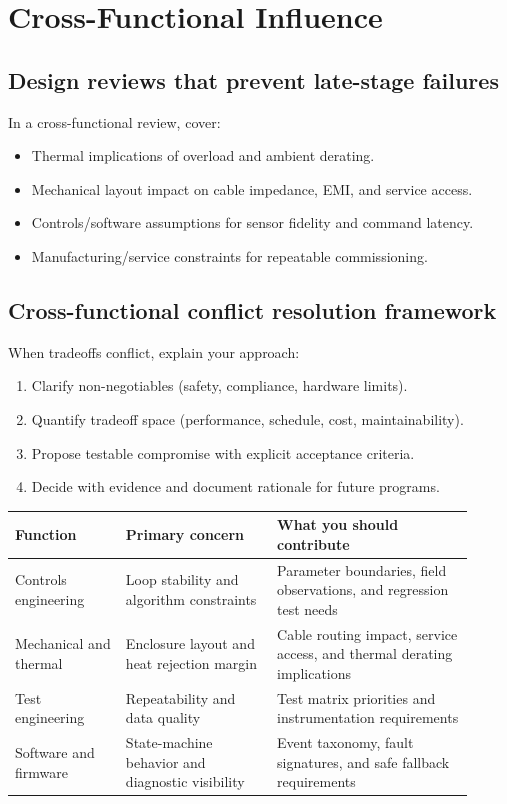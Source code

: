 \documentclass[11pt]{article}
\begin{document}
\section{Cross-Functional Influence}

\subsection{Design reviews that prevent late-stage failures}
In a cross-functional review, cover:
\begin{itemize}
  \item Thermal implications of overload and ambient derating.
  \item Mechanical layout impact on cable impedance, EMI, and service access.
  \item Controls/software assumptions for sensor fidelity and command latency.
  \item Manufacturing/service constraints for repeatable commissioning.
\end{itemize}

\subsection{Cross-functional conflict resolution framework}
When tradeoffs conflict, explain your approach:
\begin{enumerate}
  \item Clarify non-negotiables (safety, compliance, hardware limits).
  \item Quantify tradeoff space (performance, schedule, cost, maintainability).
  \item Propose testable compromise with explicit acceptance criteria.
  \item Decide with evidence and document rationale for future programs.
\end{enumerate}

\begin{table}[h]
\centering
\begin{tabular}{p{0.22\linewidth}p{0.3\linewidth}p{0.39\linewidth}}
\toprule
Function & Primary concern & What you should contribute \\
\midrule
Controls engineering & Loop stability and algorithm constraints & Parameter boundaries, field observations, and regression test needs \\
Mechanical and thermal & Enclosure layout and heat rejection margin & Cable routing impact, service access, and thermal derating implications \\
Test engineering & Repeatability and data quality & Test matrix priorities and instrumentation requirements \\
Software and firmware & State-machine behavior and diagnostic visibility & Event taxonomy, fault signatures, and safe fallback requirements \\
\bottomrule
\end{tabular}
\end{table}
\end{document}
